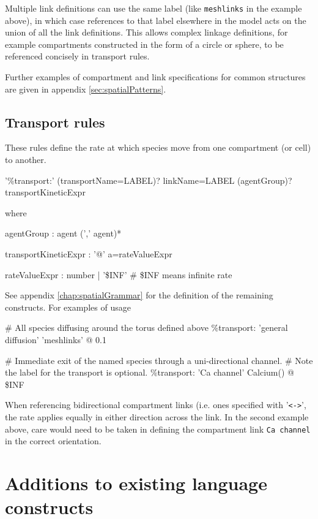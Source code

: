Multiple link definitions can use the same label (like \verb|meshlinks| in the example above), in which case references to that label elsewhere in the model acts on the union of all the link definitions. This allows complex linkage definitions, for example compartments constructed in the form of a circle or sphere, to be referenced concisely in transport rules.

Further examples of compartment and link specifications for common structures are given in appendix
 \ref{sec:spatialPatterns}.

\subsection{Transport rules}

These rules define the rate at which species move from one compartment (or cell) to another.
\begin{bnfsource}
'\%transport:' (transportName=LABEL)? linkName=LABEL (agentGroup)? transportKineticExpr
\end{bnfsource}
  where
\begin{bnfsource}
agentGroup :
  agent (',' agent)*

transportKineticExpr :
  '@' a=rateValueExpr

rateValueExpr :
  number | '\$INF'   # \$INF means infinite rate
\end{bnfsource}

See appendix \ref{chap:spatialGrammar} for the definition of the remaining constructs. For examples of usage

\begin{kappasource}
# All species diffusing around the torus defined above
\%transport: 'general diffusion' 'meshlinks' @ 0.1

# Immediate exit of the named species through a uni-directional channel.
# Note the label for the transport is optional.
\%transport: 'Ca channel' Calcium() @ \$INF
\end{kappasource}

When referencing bidirectional compartment links (i.e. ones specified with '\verb|<->|', the rate applies equally in either direction across the link. In the second example above, care would need to be taken in defining the compartment link \verb|Ca channel| in the correct orientation.

\section{Additions to existing language constructs}

